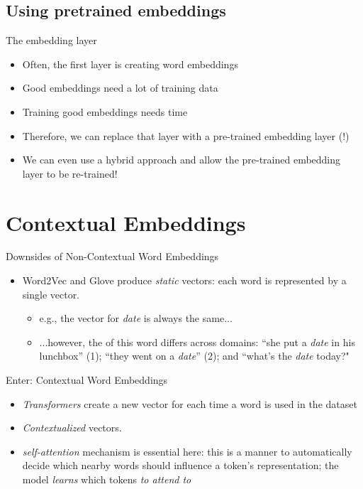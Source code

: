 \documentclass[compress]{beamer}
\begin{document}
\subsection{Using pretrained embeddings}

\begin{frame}{The embedding layer}
	\begin{itemize}
		\item Often, the first layer is creating word embeddings
		\item Good embeddings need a lot of training data
		\item Training good embeddings needs time
		\item Therefore, we can replace that layer with a pre-trained embedding layer (!)
		\item We can even use a hybrid approach and allow the pre-trained embedding layer to be re-trained!
	\end{itemize}
\end{frame}

\section{Contextual Embeddings}

\begin{frame}
\begin{alertblock}{Downsides of Non-Contextual Word Embeddings}
	\begin{itemize}
		\item Word2Vec and Glove produce \emph{static} vectors: each word is represented by a single vector.
		\begin{itemize}	
\item e.g., the vector for \emph{date} is always the same...
\item ...however, the  of this word differs across domains: ``she put a \emph{date} in his lunchbox'' (1); ``they went on a \emph{date}'' (2); and ``what's the \emph{date} today?"
		\end{itemize}
	\end{itemize}
\end{alertblock}
\begin{exampleblock}{Enter: Contextual Word Embeddings}
	\begin{itemize}
		\item \emph{Transformers} create a new vector for each time a word is used in the dataset
		\item \emph{Contextualized} vectors.
		\item \textit{self-attention} mechanism is essential here: this is a manner to automatically decide which nearby words should influence a token's representation; the model  \textit{learns} which tokens \emph{to attend to} 
	\end{itemize}
\end{exampleblock}
\end{frame}
\end{document}
